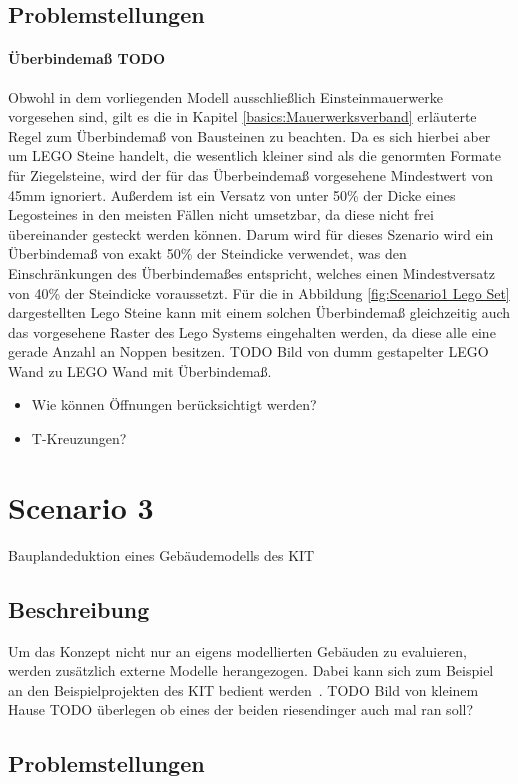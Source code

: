 \subsection*{Problemstellungen}
\paragraph{Überbindemaß TODO}
Obwohl in dem vorliegenden Modell ausschließlich Einsteinmauerwerke vorgesehen sind, gilt es die in Kapitel \ref{basics:Mauerwerksverband} erläuterte Regel zum Überbindemaß von Bausteinen zu beachten.
Da es sich hierbei aber um LEGO Steine handelt, die wesentlich kleiner sind als die genormten Formate für Ziegelsteine, wird der für das Überbeindemaß vorgesehene Mindestwert von 45mm ignoriert.
Außerdem ist ein Versatz von unter 50\% der Dicke eines Legosteines in den meisten Fällen nicht umsetzbar, da diese nicht frei übereinander gesteckt werden können.
Darum wird für dieses Szenario wird ein Überbindemaß von exakt 50\% der Steindicke verwendet, was den Einschränkungen des Überbindemaßes entspricht, welches einen Mindestversatz von 40\% der Steindicke voraussetzt.
Für die in Abbildung \ref{fig:Scenario1 Lego Set} dargestellten Lego Steine kann mit einem solchen Überbindemaß gleichzeitig auch das vorgesehene Raster des Lego Systems eingehalten werden, da diese alle eine gerade Anzahl an Noppen besitzen.
TODO Bild von dumm gestapelter LEGO Wand zu LEGO Wand mit Überbindemaß.
\begin{itemize}
  \item Wie können Öffnungen berücksichtigt werden?
  \item T-Kreuzungen?
\end{itemize}

\section{Scenario 3}\label{scenarios:scenario3}
Bauplandeduktion eines Gebäudemodells des KIT
\subsection*{Beschreibung}
Um das Konzept nicht nur an eigens modellierten Gebäuden zu evaluieren, werden zusätzlich externe Modelle herangezogen.
Dabei kann sich zum Beispiel an den Beispielprojekten des KIT bedient werden~\cite{KITSAMPLEHOUSE:online}.
TODO Bild von kleinem Hause
TODO überlegen ob eines der beiden riesendinger auch mal ran soll?
\subsection*{Problemstellungen}

